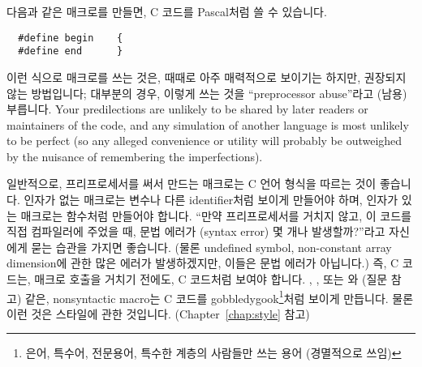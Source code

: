\begin{faq}
	다음과 같은 매크로를 만들면, C 코드를 Pascal처럼 쓸 수 있습니다.
\begin{verbatim}
  #define begin    {
  #define end      }
\end{verbatim}
\A
	이런 식으로 매크로를 쓰는 것은, 때때로 아주 매력적으로 보이기는 하지만,
        권장되지 않는 방법입니다; 대부분의 경우, 이렇게 쓰는 것을 ``preprocessor
        abuse''라고 (남용) 부릅니다.  
        Your predilections are unlikely to be shared by later readers or
        maintainers of the code, and any simulation of another language is
        most unlikely to be perfect (so any alleged convenience or utility 
        will probably be outweighed by the nuisance of remembering the
        imperfections).


        일반적으로, 프리프로세서를 써서 만드는 매크로는 C 언어 형식을 따르는
        것이 좋습니다. 인자가 없는 매크로는 변수나 다른 identifier처럼 보이게
        만들어야 하며, 인자가 있는 매크로는 함수처럼 만들어야 합니다.
        ``만약 프리프로세서를 거치지 않고, 이 코드를 직접 컴파일러에 주었을
        때, 문법 에러가 (syntax error) 몇 개나 발생할까?''라고 자신에게 묻는
        습관을 가지면 좋습니다. (물론 undefined symbol, non-constant array 
        dimension에 관한 많은 에러가 발생하겠지만, 이들은 문법 에러가 아닙니다.)
        즉, C 코드는, 매크로 호출을 거치기 전에도, C 코드처럼 보여야 합니다.
        , , 또는 와 (질문  참고) 같은,
        nonsyntactic macro는 C 코드를 gobbledygook\footnote{은어, 특수어,
          전문용어, 특수한 계층의 사람들만 쓰는 용어 (경멸적으로 쓰임)}처럼
        보이게 만듭니다. 물론 이런 것은 스타일에 관한 것입니다.
        (Chapter~\ref{chap:style} 참고)
\end{faq}

